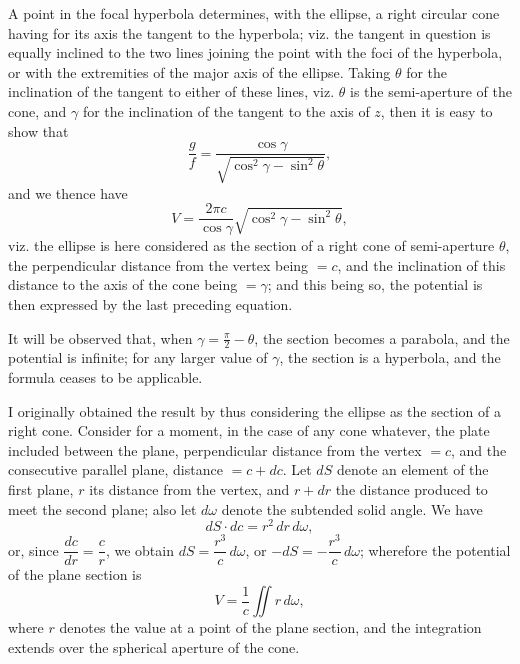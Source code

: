 \documentclass[11pt,a4paper]{book}
\begin{document}
\begin{art}
A point in the focal hyperbola determines, with the ellipse, a right circular cone having for its axis the tangent to the hyperbola; viz. the tangent in question is equally inclined to the two lines joining the point with the foci of the hyperbola, or with the extremities of the major axis of the ellipse. Taking $\theta$ for the inclination of the tangent to either of these lines, viz. $\theta$ is the semi-aperture of the cone, and $\gamma$ for the inclination of the tangent to the axis of $z$, then it is easy to show that
\[
\frac{g}{f} = \frac{\cos\gamma}{\sqrt{\cos^2\gamma - \sin^2\theta}},
\]
and we thence have
\[
V = \frac{2\pi c}{\cos\gamma}\sqrt{\cos^2\gamma - \sin^2\theta},
\]
viz. the ellipse is here considered as the section of a right cone of semi-aperture $\theta$, the perpendicular distance from the vertex being $=c$, and the inclination of this distance to the axis of the cone being $=\gamma$; and this being so, the potential is then expressed by the last preceding equation.

It will be observed that, when $\gamma = \frac{\pi}{2} - \theta$, the section becomes a parabola, and the potential is infinite; for any larger value of $\gamma$, the section is a hyperbola, and the formula ceases to be applicable.
\end{art}

\begin{art}
I originally obtained the result by thus considering the ellipse as the section of a right cone. Consider for a moment, in the case of any cone whatever, the plate included between the plane, perpendicular distance from the vertex $=c$, and the consecutive parallel plane, distance $=c+dc$. Let $dS$ denote an element of the first plane, $r$ its distance from the vertex, and $r + dr$ the distance produced to meet the second plane; also let $d\omega$ denote the subtended solid angle. We have
\[ dS \cdot dc = r^2\,dr\,d\omega, \]
or, since $\dfrac{dc}{dr} = \dfrac{c}{r}$, we obtain $dS = \dfrac{r^3}{c}\,d\omega$, or $-dS = -\dfrac{r^3}{c}\,d\omega$; wherefore the potential of the plane section is
\[
V = \frac{1}{c}\iint r\,d\omega,
\]
where $r$ denotes the value at a point of the plane section, and the integration extends over the spherical aperture of the cone.
\end{art}
\end{document}
